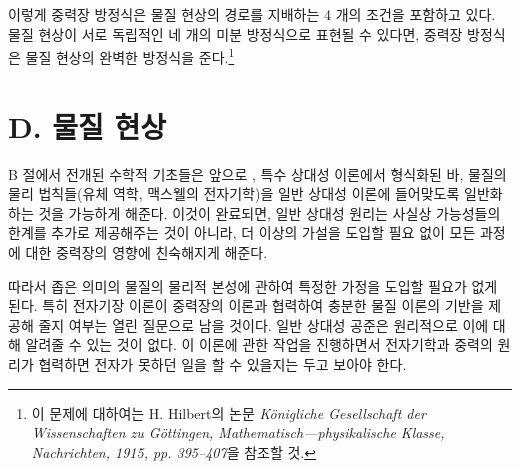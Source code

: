 이렇게 중력장 방정식은 물질 현상의 경로를 지배하는 4 개의 조건을 포함하고 있다. 물질 현상이 서로 독립적인 네 개의 미분 방정식으로 표현될 수 있다면, 중력장 방정식은 물질 현상의 완벽한 방정식을 준다.\footnote{이 문제에 대하여는 H. Hilbert의 논문 \emph{K\"onigliche Gesellschaft der Wissenschaften zu G\"ottingen, Mathematisch—physikalische Klasse, Nachrichten, 1915, pp. 395–407}을 참조할 것.}

\section*{D. 물질 현상}
B 절에서 전개된 수학적 기초들은 앞으로 , 특수 상대성 이론에서 형식화된 바, 물질의 물리 법칙들(유체 역학, 맥스웰의 전자기학)을 일반 상대성 이론에 들어맞도록 일반화하는 것을 가능하게 해준다. 이것이 완료되면, 일반 상대성 원리는 사실상 가능성들의 한계를 추가로 제공해주는 것이 아니라, 더 이상의 가설을 도입할 필요 없이 모든 과정에 대한 중력장의 영향에 친숙해지게 해준다.

따라서 좁은 의미의 물질의 물리적 본성에 관하여 특정한 가정을 도입할 필요가 없게 된다. 특히 전자기장 이론이 중력장의 이론과 협력하여 충분한 물질 이론의 기반을 제공해 줄지 여부는 열린 질문으로 남을 것이다. 일반 상대성 공준은 원리적으로 이에 대해 알려줄 수 있는 것이 없다. 이 이론에 관한 작업을 진행하면서 전자기학과 중력의 원리가 협력하면 전자가 못하던 일을 할 수 있을지는 두고 보아야 한다.

